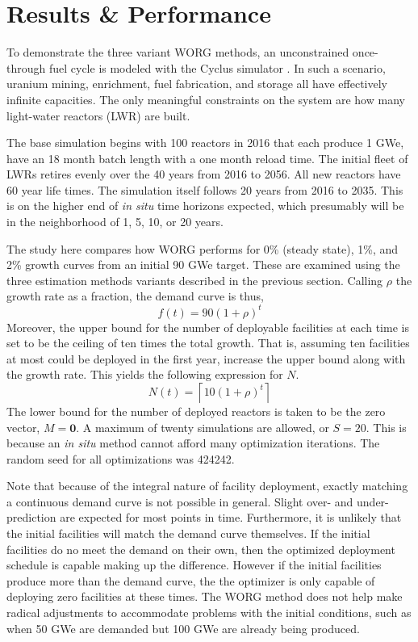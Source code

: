 \section{Results \& Performance}
\label{results}

To demonstrate the three variant WORG methods, an unconstrained 
once-through fuel cycle is modeled with the Cyclus simulator 
\cite{DBLP:journals/corr/HuffGCFMOSSW15}. In such a scenario, uranium
mining, enrichment, fuel fabrication, and storage all have effectively 
infinite capacities. The only meaningful constraints on the system are
how many light-water reactors (LWR) are built.

The base simulation begins with 100 reactors in 2016 that each produce
1 GWe, have an 18 month batch length with a one month reload time.
The initial fleet of LWRs retires evenly over the 40 years from 2016 to 
2056. All new reactors have 60 year life times.  The simulation itself 
follows 20 years from 2016 to 2035. This is on the higher end of 
\emph{in situ} time horizons expected, which presumably 
will be in the neighborhood of 1, 5, 10, or 20 years.

The study here compares how WORG performs for 0\% (steady state), 1\%, 
and 2\% growth curves from an initial 90 GWe target. These are examined
using the three estimation methods variants described in the previous section.
Calling $\rho$ the growth rate as a 
fraction, the demand curve is thus,
\begin{equation}
\label{f-rate}
f(t) = 90 (1 + \rho)^t
\end{equation}
Moreover, the upper bound for the number of deployable facilities at 
each time is set to be the ceiling of ten times the total growth. 
That is, assuming ten facilities at most could be deployed in the first
year, increase the upper bound along with the growth rate.  This yields
the following expression for $N$.
\begin{equation}
\label{n-rate}
N(t) = \left\lceil 10 (1 + \rho)^t\right\rceil
\end{equation}
The lower bound for the number of deployed reactors is taken to be the 
zero vector, $M = \mathbf{0}$.  A maximum of twenty simulations are allowed, 
or $S = 20$.
This is because an \emph{in situ} method cannot afford many optimization 
iterations. The random seed for all optimizations was 424242.

Note that because of the integral nature of facility deployment, 
exactly matching a continuous demand curve is not possible in general. 
Slight over- and under-prediction are expected for most points in time. 
Furthermore, 
it is unlikely that the initial facilities will match the demand curve 
themselves. If the initial facilities do no meet the demand on their own, 
then the optimized deployment schedule is capable making up the difference.
However if the initial facilities produce more than the demand curve, 
the the optimizer is only capable of deploying zero facilities at these
times. The WORG method does not help make radical adjustments to 
accommodate 
problems with the initial conditions, such as when 50 GWe are demanded 
but 100 GWe are already being produced.

